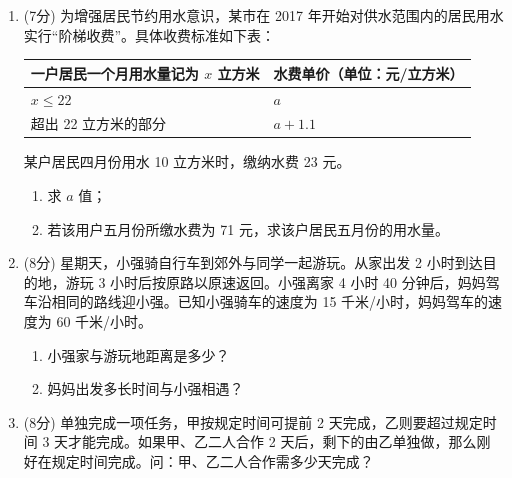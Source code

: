 \documentclass[11pt,a4paper]{ctexart}
\begin{document}
\begin{enumerate}
    \item[12.] (7分) 为增强居民节约用水意识，某市在 2017 年开始对供水范围内的居民用水实行“阶梯收费”。具体收费标准如下表：
    \begin{table}[htbp]
        \centering
        \begin{tabular}{|l|l|}
            \hline
            一户居民一个月用水量记为 $x$ 立方米 & 水费单价（单位：元/立方米） \\
            \hline
            $x \le 22$ & $a$ \\
            \hline
            超出 22 立方米的部分 & $a+1.1$ \\
            \hline
        \end{tabular}
    \end{table}
    某户居民四月份用水 10 立方米时，缴纳水费 23 元。
    \begin{enumerate}
        \item[(1)] 求 $a$ 值；
        \vspace{3.0cm}
        
        \item[(2)] 若该用户五月份所缴水费为 71 元，求该户居民五月份的用水量。
        \vspace{3.5cm}
    \end{enumerate}
    
    \item[13.] (8分) 星期天，小强骑自行车到郊外与同学一起游玩。从家出发 2 小时到达目的地，游玩 3 小时后按原路以原速返回。小强离家 4 小时 40 分钟后，妈妈驾车沿相同的路线迎小强。已知小强骑车的速度为 15 千米/小时，妈妈驾车的速度为 60 千米/小时。
    \begin{enumerate}
        \item[(1)] 小强家与游玩地距离是多少？
        \vspace{3.0cm}
        
        \item[(2)] 妈妈出发多长时间与小强相遇？
        \vspace{3.5cm}
    \end{enumerate}

    \item[14.] (8分) 单独完成一项任务，甲按规定时间可提前 2 天完成，乙则要超过规定时间 3 天才能完成。如果甲、乙二人合作 2 天后，剩下的由乙单独做，那么刚好在规定时间完成。问：甲、乙二人合作需多少天完成？
    \vspace{4.5cm}
\end{enumerate}
\end{document}
